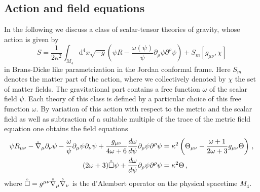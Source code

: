 \documentclass[notitlepage,a4paper,aps,prd,onecolumn,superscriptaddress,nofootinbib,groupedaddress,longbibliography]{revtex4-1}
\newcommand{\dd}{\mathrm{d}}
\newcommand{\lc}[1]{\accentset{\circ}{#1}}
\begin{document}
\subsection{Action and field equations}\label{ssec:exaction}
In the following we discuss a class of scalar-tensor theories of gravity, whose action is given by~\cite{Nordtvedt:1970uv}
\begin{equation}\label{eq:exaction}
S = \frac{1}{2\kappa^2}\int_{M_4}\dd^4x\sqrt{-g}\left(\psi R - \frac{\omega(\psi)}{\psi}\partial_{\rho}\psi\partial^{\rho}\psi\right) + S_m[g_{\mu\nu}, \chi]
\end{equation}
in Brans-Dicke like parametrization in the Jordan conformal frame. Here \(S_m\) denotes the matter part of the action, where we collectively denoted by \(\chi\) the set of matter fields. The gravitational part contains a free function \(\omega\) of the scalar field \(\psi\). Each theory of this class is defined by a particular choice of this free function \(\omega\). By variation of this action with respect to the metric and the scalar field as well as subtraction of a suitable multiple of the trace of the metric field equation one obtains the field equations
\begin{subequations}\label{eq:stgfeq}
\begin{align}
\psi R_{\mu\nu} - \lc{\nabla}_{\mu}\partial_{\nu}\psi - \frac{\omega}{\psi}\partial_{\mu}\psi\partial_{\nu}\psi + \frac{g_{\mu\nu}}{4\omega + 6}\frac{d\omega}{d\psi}\partial_{\rho}\psi\partial^{\rho}\psi &= \kappa^2\left(\Theta_{\mu\nu} - \frac{\omega + 1}{2\omega + 3}g_{\mu\nu}\Theta\right)\,,\label{eq:stgmeteq}\\
(2\omega + 3)\lc{\square}\psi + \frac{d\omega}{d\psi}\partial_{\rho}\psi\partial^{\rho}\psi &= \kappa^2\Theta\,,\label{eq:stgscaleq}
\end{align}
\end{subequations}
where \(\lc{\square} = g^{\mu\nu}\lc{\nabla}_{\mu}\lc{\nabla}_{\nu}\) is the d'Alembert operator on the physical spacetime \(M_4\).
\end{document}
